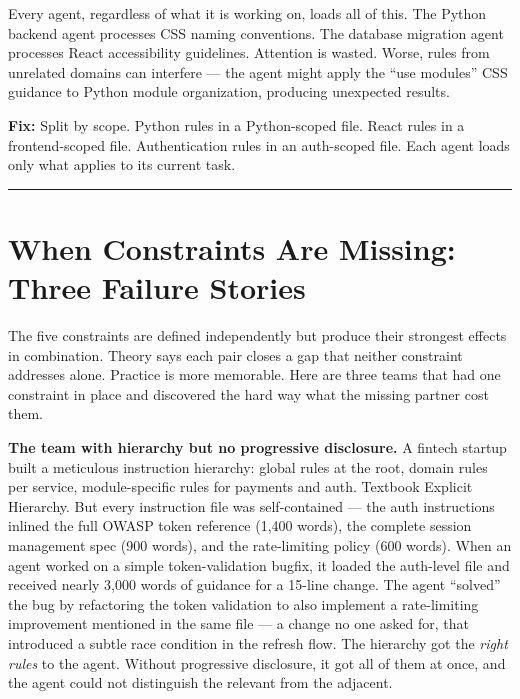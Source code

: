 \documentclass[
  a4paper,
  DIV=11,
  numbers=noendperiod]{scrreprt}
\begin{document}
Every agent, regardless of what it is working on, loads all of this. The
Python backend agent processes CSS naming conventions. The database
migration agent processes React accessibility guidelines. Attention is
wasted. Worse, rules from unrelated domains can interfere --- the agent
might apply the ``use modules'' CSS guidance to Python module
organization, producing unexpected results.

\textbf{Fix:} Split by scope. Python rules in a Python-scoped file.
React rules in a frontend-scoped file. Authentication rules in an
auth-scoped file. Each agent loads only what applies to its current
task.

\begin{center}\rule{0.5\linewidth}{0.5pt}\end{center}

\section{When Constraints Are Missing: Three Failure
Stories}\label{when-constraints-are-missing-three-failure-stories}

The five constraints are defined independently but produce their
strongest effects in combination. Theory says each pair closes a gap
that neither constraint addresses alone. Practice is more memorable.
Here are three teams that had one constraint in place and discovered the
hard way what the missing partner cost them.

\textbf{The team with hierarchy but no progressive disclosure.} A
fintech startup built a meticulous instruction hierarchy: global rules
at the root, domain rules per service, module-specific rules for
payments and auth. Textbook Explicit Hierarchy. But every instruction
file was self-contained --- the auth instructions inlined the full OWASP
token reference (1,400 words), the complete session management spec (900
words), and the rate-limiting policy (600 words). When an agent worked
on a simple token-validation bugfix, it loaded the auth-level file and
received nearly 3,000 words of guidance for a 15-line change. The agent
``solved'' the bug by refactoring the token validation to also implement
a rate-limiting improvement mentioned in the same file --- a change no
one asked for, that introduced a subtle race condition in the refresh
flow. The hierarchy got the \emph{right rules} to the agent. Without
progressive disclosure, it got all of them at once, and the agent could
not distinguish the relevant from the adjacent.
\end{document}
